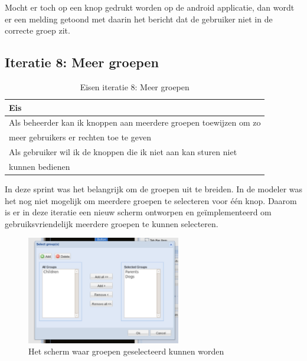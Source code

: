 \documentclass[]{article}
\begin{document}
Mocht er toch op een knop gedrukt worden op de android applicatie, dan wordt er een
melding getoond met daarin het bericht dat de gebruiker niet in de correcte
groep zit. 

\subsection{Iteratie 8: Meer groepen}

\begin{table}[htpb]
  \caption{Eisen iteratie 8: Meer groepen}
  \begin{center}
    \begin{tabular}{|| l ||}\hline
        Eis                                                              \\\hline\hline
        Als beheerder kan ik knoppen aan meerdere groepen toewijzen om zo\\
        meer gebruikers er rechten toe te geven                          \\\hline
        Als gebruiker wil ik de knoppen die ik niet aan kan sturen niet  \\ 
        kunnen bedienen                                                  \\\hline
    \end{tabular}
  \end{center}
\end{table}

In deze sprint was het belangrijk om de groepen uit te breiden. In de modeler was
het nog niet mogelijk om meerdere groepen te selecteren voor \'e\'en knop.
Daarom is er in deze iteratie een nieuw scherm ontworpen en ge\"implementeerd
om gebruiksvriendelijk meerdere groepen te kunnen selecteren.

\begin{figure}[h!]
  \centering
    \includegraphics[width=0.6\textwidth,keepaspectratio]{groupselect.pdf}
  \caption{Het scherm waar groepen geselecteerd kunnen worden}
  \label{groupselect}
\end{figure}
\end{document}
